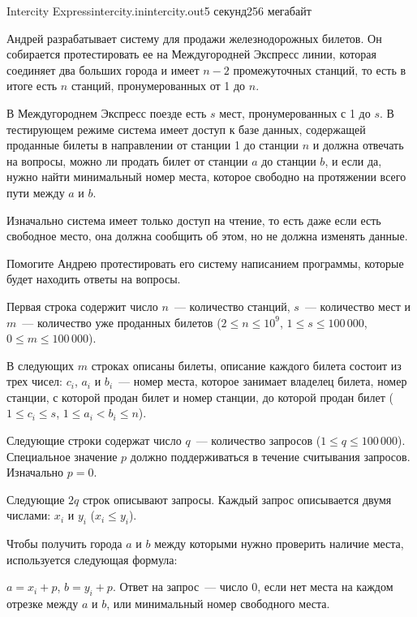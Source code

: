 \begin{problem}{Intercity Express}{intercity.in}{intercity.out}{5 секунд}{256 мегабайт}


Андрей разрабатывает систему для продажи железнодорожных билетов.
Он собирается протестировать ее на Междугородней Экспресс линии, которая соединяет два больших города и имеет $n-2$ промежуточных станций, то есть в итоге есть $n$ станций, пронумерованных от 1 до $n$.

В Междугороднем Экспресс поезде есть $s$ мест, пронумерованных с 1 до $s$.
В тестирующем режиме система имеет доступ к базе данных, содержащей проданные билеты в направлении от станции 1 до станции $n$ и должна отвечать на вопросы, можно ли продать билет от станции $a$ до станции $b$, и если да, нужно найти минимальный номер места, которое свободно на протяжении всего пути между $a$ и $b$. 

Изначально система имеет только доступ на чтение, то есть даже если есть свободное место, она должна сообщить об этом, но не должна изменять данные.

Помогите Андрею протестировать его систему написанием программы, которые будет находить ответы на вопросы.

\InputFile
Первая строка содержит число $n$~--- количество станций, $s$~--- количество мест и $m$~--- количество уже проданных билетов ($2 \le n \le 10^9$,
$1 \le s \le 100\,000$, $0 \le m \le 100\,000$).

В следующих $m$ строках описаны билеты, описание каждого билета состоит из трех чисел: $c_i$, $a_i$ и $b_i$~--- номер места, которое занимает владелец билета, номер станции, с которой продан билет и номер станции, до которой продан билет ($1 \le c_i \le s$, $1 \le a_i < b_i \le n$).

Следующие строки содержат число $q$~--- количество запросов ($1 \le q \le 100\,000$). 
Специальное значение $p$ должно поддерживаться в течение считывания запросов. Изначально $p = 0$.

Следующие $2q$ строк описывают запросы. Каждый запрос описывается двумя числами: $x_i$ и $y_i$ ($x _i \le y_i$).

Чтобы получить города $a$ и $b$ между которыми нужно проверить наличие места, используется следующая формула:

$a = x_i + p$, $b = y_i + p$. Ответ на запрос~--- число 0, если нет места на каждом отрезке между $a$ и $b$, или минимальный номер свободного места.


\end{problem}
